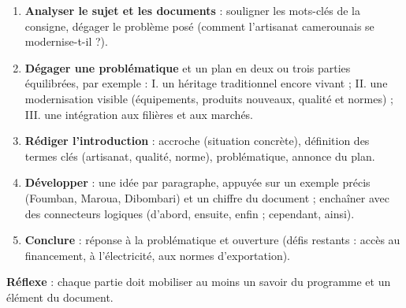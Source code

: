 \documentclass[11pt]{article}
\newcommand{\cle}[1]{{\popxbold\color{popdark}#1}}
\begin{document}
\begin{methode}
\begin{enumerate}
\item \textbf{Analyser le sujet et les documents} : souligner les mots-clés de la consigne, dégager le problème posé (comment l'artisanat camerounais se modernise-t-il ?).
\item \textbf{Dégager une problématique} et un plan en deux ou trois parties équilibrées, par exemple : I. un héritage traditionnel encore vivant ; II. une modernisation visible (équipements, produits nouveaux, qualité et normes) ; III. une intégration aux filières et aux marchés.
\item \textbf{Rédiger l'introduction} : accroche (situation concrète), définition des termes clés (artisanat, \cle{qualité}, \cle{norme}), problématique, annonce du plan.
\item \textbf{Développer} : une idée par paragraphe, appuyée sur un exemple précis (Foumban, Maroua, Dibombari) et un chiffre du document ; enchaîner avec des connecteurs logiques (d'abord, ensuite, enfin ; cependant, ainsi).
\item \textbf{Conclure} : réponse à la problématique et ouverture (défis restants : accès au financement, à l'électricité, aux normes d'exportation).
\end{enumerate}
\textbf{Réflexe} : chaque partie doit mobiliser au moins un savoir du programme et un élément du document.
\end{methode}
\end{document}
